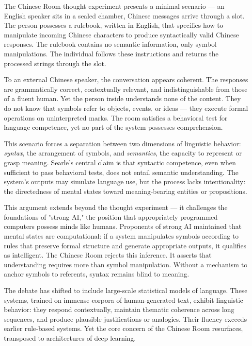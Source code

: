The Chinese Room thought experiment presents a minimal scenario — an English speaker sits in a sealed chamber, Chinese messages arrive through a slot. The person possesses a rulebook, written in English, that specifies how to manipulate incoming Chinese characters to produce syntactically valid Chinese responses. The rulebook contains no semantic information, only symbol manipulations. The individual follows these instructions and returns the processed strings through the slot.

To an external Chinese speaker, the conversation appears coherent. The responses are grammatically correct, contextually relevant, and indistinguishable from those of a fluent human. Yet the person inside understands none of the content. They do not know that symbols refer to objects, events, or ideas — they execute formal operations on uninterpreted marks. The room satisfies a behavioral test for language competence, yet no part of the system possesses comprehension.

This scenario forces a separation between two dimensions of linguistic behavior: \textit{syntax}, the arrangement of symbols, and \textit{semantics}, the capacity to represent or grasp meaning. Searle's central claim is that syntactic competence, even when sufficient to pass behavioral tests, does not entail semantic understanding. The system's outputs may simulate language use, but the process lacks intentionality: the directedness of mental states toward meaning-bearing entities or propositions.

This argument extends beyond the thought experiment — it challenges the foundations of "strong AI," the position that appropriately programmed computers possess minds like humans. Proponents of strong AI maintained that mental states are computational: if a system manipulates symbols according to rules that preserve formal structure and generate appropriate outputs, it qualifies as intelligent. The Chinese Room rejects this inference. It asserts that understanding requires more than symbol manipulation. Without a mechanism to anchor symbols to referents, syntax remains blind to meaning.

The debate has shifted to include large-scale statistical models of language. These systems, trained on immense corpora of human-generated text, exhibit linguistic behavior: they respond contextually, maintain thematic coherence across long sequences, and produce plausible justifications or analogies. Their fluency exceeds earlier rule-based systems. Yet the core concern of the Chinese Room resurfaces, transposed to architectures of deep learning.

